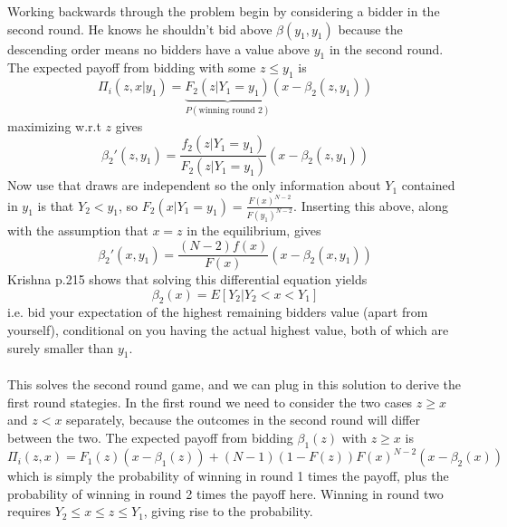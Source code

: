 Working backwards through the problem begin by considering a bidder in the second round. He knows he shouldn't bid above $\beta(y_1,y_1)$ because the descending order means no bidders have a value above $y_1$ in the second round. The expected payoff from bidding with some $z\leq y_1$ is 
\begin{equation}
    \Pi_i(z,x|y_1) = \underbrace{F_2(z|Y_1 = y_1)}_{P(\text{winning round 2})} (x-\beta_2(z, y_1))
\end{equation}
maximizing w.r.t $z$ gives 
\begin{equation}
    \beta_2'(z, y_1) = \frac{f_2(z|Y_1 = y_1)}{F_2(z|Y_1 = y_1)}(x - \beta_2(z,y_1))
\end{equation}
Now use that draws are independent so the only information about $Y_1$ contained in $y_1$ is that $Y_2<y_1$, so $F_2(x|Y_1 = y_1)=\frac{F(x)^{N-2}}{F(y_1)^{N-2}}$. Inserting this above, along with the assumption that $x=z$ in the equilibrium, gives 
\begin{equation}
    \beta_2'(x, y_1) = \frac{(N-2)f(x)}{F(x)}(x - \beta_2(x,y_1))
\end{equation}
Krishna p.215 shows that solving this differential equation yields 
\begin{equation}
    \beta_2(x) = E[Y_2|Y_2< x < Y_1]
\end{equation}
i.e. bid your expectation of the highest remaining bidders value (apart from yourself), conditional on you having the actual highest value, both of which are surely smaller than $y_1$. 
\\ \\
This solves the second round game, and we can plug in this solution to derive the first round stategies. In the first round we need to consider the two cases $z\geq x$ and $z<x$ separately, because the outcomes in the second round will differ between the two. The expected payoff from bidding $\beta_1(z)$ with $z\geq x$ is 
\begin{equation}
    \Pi_i(z,x) = F_1(z)(x-\beta_1(z)) + (N-1)(1-F(z))F(x)^{N-2}(x-\beta_2(x))
\end{equation}
which is simply the probability of winning in round 1 times the payoff, plus the probability of winning in round 2 times the payoff here. Winning in round two requires $Y_2 \leq x \leq z \leq Y_1$, giving rise to the probability. 

